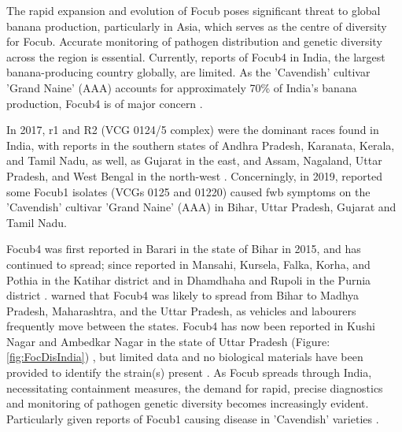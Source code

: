 The rapid expansion and evolution of \ac{Focub} poses significant threat to global banana production, particularly in Asia, which serves as the centre of diversity for \ac{Focub}. Accurate monitoring of pathogen distribution and genetic diversity across the region is essential.  Currently, reports of \ac{Focub4} in India, the largest banana-producing country globally, are limited. As the 'Cavendish' cultivar 'Grand Naine' (AAA) accounts for approximately 70\% of India's banana production, \ac{Focub4} is of major concern \parencite{Damodaran2019}. 

In 2017, \ac{r1} and R2 (VCG 0124/5 complex) were the dominant races found in India, with reports in  the southern states of Andhra Pradesh, Karanata, Kerala, and Tamil Nadu, as well, as Gujarat in the east, and Assam, Nagaland, Uttar Pradesh, and West Bengal in the north-west \parencite{Mostert2017, Thangavelu2020}. Concerningly, in 2019, \textcite{Thangavelu2020} reported some \ac{Focub1} isolates (VCGs 0125 and 01220) caused \ac{fwb} symptoms on the 'Cavendish' cultivar 'Grand Naine' (AAA) in Bihar, Uttar Pradesh, Gujarat and Tamil Nadu.  

\Ac{Focub4} was first reported in Barari in the state of Bihar in 2015, and has continued to spread; since  reported in Mansahi, Kursela, Falka, Korha, and Pothia in the Katihar district and in Dhamdhaha and Rupoli in the Purnia district \parencite{Thangavelu2019}. \textcite{Viljoen2020} warned that \ac{Focub4} was likely to spread from Bihar to Madhya Pradesh, Maharashtra, and the Uttar Pradesh, as vehicles and labourers frequently move between the states. \ac{Focub4} has now been reported in Kushi Nagar and Ambedkar Nagar in the state of Uttar Pradesh (Figure: \ref{fig:FocDisIndia}) \parencite{Damodaran2019, Thangavelu2019}, but limited data and no biological materials have been provided to identify the strain(s) present \parencite{Kema2021}. As \ac{Focub} spreads through India, necessitating containment measures, the demand for rapid, precise diagnostics and monitoring of pathogen genetic diversity becomes increasingly evident. Particularly given reports of \ac{Focub1} causing disease in 'Cavendish' varieties \parencite{Thangavelu2020}.

